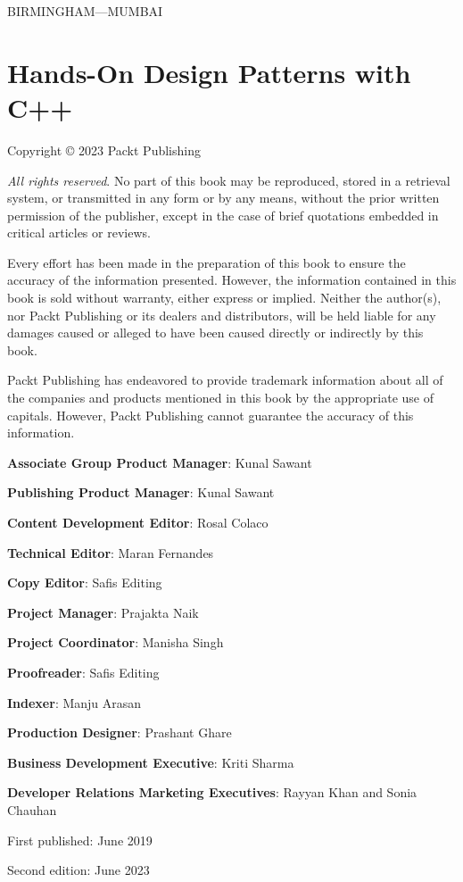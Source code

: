 BIRMINGHAM---MUMBAI

\section{Hands-On Design Patterns with C++}

Copyright © 2023 Packt Publishing

\emph{All rights reserved}. No part of this book may be reproduced, stored in a retrieval system, or transmitted in any form or by any means, without the prior written permission of the publisher, except in the case of brief quotations embedded in critical articles or reviews.

Every effort has been made in the preparation of this book to ensure the accuracy of the information presented. However, the information contained in this book is sold without warranty, either express or implied. Neither the author(s), nor Packt Publishing or its dealers and distributors, will be held liable for any damages caused or alleged to have been caused directly or indirectly by this book.

Packt Publishing has endeavored to provide trademark information about all of the companies and products mentioned in this book by the appropriate use of capitals. However, Packt Publishing cannot guarantee the accuracy of this information.

\textbf{Associate Group Product Manager}: Kunal Sawant

\textbf{Publishing Product Manager}: Kunal Sawant

\textbf{Content Development Editor}: Rosal Colaco

\textbf{Technical Editor}: Maran Fernandes

\textbf{Copy Editor}: Safis Editing

\textbf{Project Manager}: Prajakta Naik

\textbf{Project Coordinator}: Manisha Singh

\textbf{Proofreader}: Safis Editing

\textbf{Indexer}: Manju Arasan

\textbf{Production Designer}: Prashant Ghare

\textbf{Business Development Executive}: Kriti Sharma

\textbf{Developer Relations Marketing Executives}: Rayyan Khan and Sonia Chauhan

First published: June 2019

Second edition: June 2023

